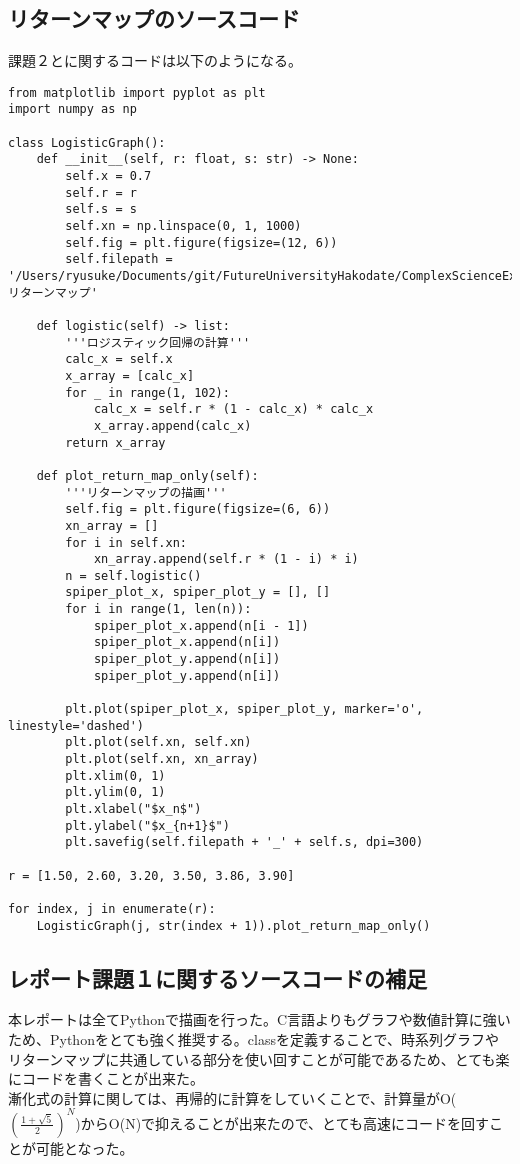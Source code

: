 \documentclass[a4j]{jsarticle}
\begin{document}
\newpage

\subsection{リターンマップのソースコード}

課題２とに関するコードは以下のようになる。

\begin{lstlisting}[caption=Pythonによるリターンマップの描画]
from matplotlib import pyplot as plt
import numpy as np

class LogisticGraph():
    def __init__(self, r: float, s: str) -> None:
        self.x = 0.7
        self.r = r
        self.s = s
        self.xn = np.linspace(0, 1, 1000)
        self.fig = plt.figure(figsize=(12, 6))
        self.filepath = '/Users/ryusuke/Documents/git/FutureUniversityHakodate/ComplexScienceExercise/result/week01_リターンマップ'

    def logistic(self) -> list:
        '''ロジスティック回帰の計算'''
        calc_x = self.x
        x_array = [calc_x]
        for _ in range(1, 102):
            calc_x = self.r * (1 - calc_x) * calc_x
            x_array.append(calc_x)
        return x_array

    def plot_return_map_only(self):
        '''リターンマップの描画'''
        self.fig = plt.figure(figsize=(6, 6))
        xn_array = []
        for i in self.xn:
            xn_array.append(self.r * (1 - i) * i)
        n = self.logistic()
        spiper_plot_x, spiper_plot_y = [], []
        for i in range(1, len(n)):
            spiper_plot_x.append(n[i - 1])
            spiper_plot_x.append(n[i])
            spiper_plot_y.append(n[i])
            spiper_plot_y.append(n[i])

        plt.plot(spiper_plot_x, spiper_plot_y, marker='o', linestyle='dashed')
        plt.plot(self.xn, self.xn)
        plt.plot(self.xn, xn_array)
        plt.xlim(0, 1)
        plt.ylim(0, 1)
        plt.xlabel("$x_n$")
        plt.ylabel("$x_{n+1}$")
        plt.savefig(self.filepath + '_' + self.s, dpi=300)

r = [1.50, 2.60, 3.20, 3.50, 3.86, 3.90]

for index, j in enumerate(r):
    LogisticGraph(j, str(index + 1)).plot_return_map_only()
\end{lstlisting}

\newpage

\subsection{レポート課題１に関するソースコードの補足}
本レポートは全てPythonで描画を行った。C言語よりもグラフや数値計算に強いため、Pythonをとても強く推奨する。classを定義することで、時系列グラフやリターンマップに共通している部分を使い回すことが可能であるため、とても楽にコードを書くことが出来た。\\
漸化式の計算に関しては、再帰的に計算をしていくことで、計算量がO($\displaystyle ({\frac{1 + \sqrt{5}}{2}})^N$)からO(N)で抑えることが出来たので、とても高速にコードを回すことが可能となった。
\end{document}
